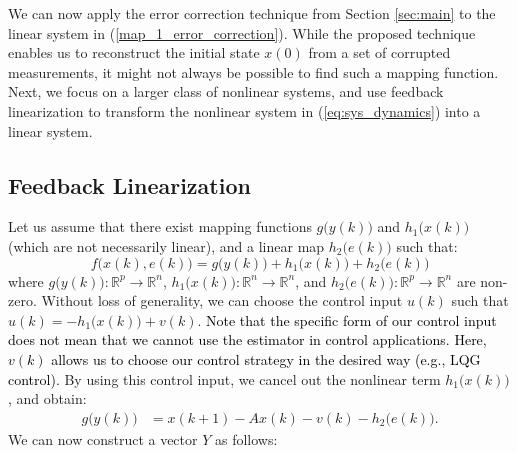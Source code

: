 We can now apply the error correction technique from Section \ref{sec:main} to the linear system in (\ref{map_1_error_correction}). While the proposed technique enables us to reconstruct the initial state $x(0)$ from a set of corrupted measurements, it might not always be possible to find such a mapping function. Next, we focus on a larger class of nonlinear systems, and use feedback linearization to transform the nonlinear system in (\ref{eq:sys_dynamics}) into a linear system.



\subsection{Feedback Linearization}
Let us assume that there exist mapping functions $g\big(y(k)\big)$ and $h_1\big(x(k)\big)$ (which are not necessarily linear), and a linear map $h_2\big(e(k)\big)$ such that:
\begin{equation}\label{eq:form_feedback}
f\big(x(k),e(k)\big)= g\big(y(k)\big) + h_1\big(x(k)\big) + h_2\big(e(k)\big)	
\end{equation}
where $g\big(y(k)\big): \mathbb{R}^p \rightarrow \mathbb{R}^n$, $h_1\big(x(k)\big): \mathbb{R}^n \rightarrow \mathbb{R}^n$, and $h_2\big(e(k)\big): \mathbb{R}^p \rightarrow \mathbb{R}^n$ are non-zero.
Without loss of generality, we can choose the control input $u(k)$ such that $u(k)=-h_1 \big(x(k) \big)+v(k)$. \noindent \textcolor{black}{Note that the specific form of our control input does not mean that we cannot use the estimator in control applications. Here, $v(k)$ allows us to choose our control strategy in the desired way (e.g., LQG control).} By using this control input, we cancel out the nonlinear term $h_1\big(x(k)\big)$, and obtain:
\begin{equation}
\begin{aligned}
	g\big(y(k)\big) &= x(k+1) - A x(k) - v(k) - h_2\big(e(k)\big).\nonumber
\end{aligned}
\end{equation}
We can now construct a vector $Y$ as follows:
